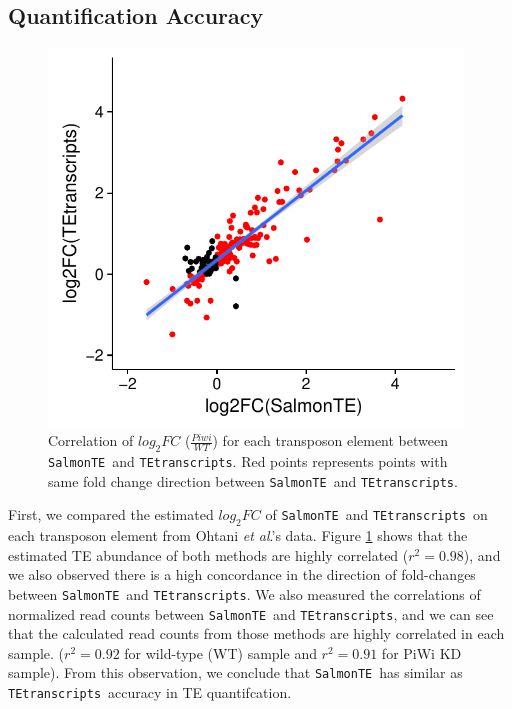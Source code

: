 \documentclass{ws-procs11x85}
\newcommand{\etal}{\textit{et al}.}
\newcommand{\TEtranscripts}{\texttt{TEtranscripts}}
\newcommand{\SalmonTE}{\texttt{SalmonTE}}
\begin{document}
\subsection{Quantification Accuracy}

\begin{figure}[h]
\centerline{
\includegraphics[width=11cm]{figure_corr_FC}
}
\caption{Correlation of $log_{2}FC$ ($\frac{Piwi}{WT}$) for each transposon element between \SalmonTE~and \TEtranscripts. Red points represents points with same fold change direction between \SalmonTE~and \TEtranscripts.}
\label{aba:fig2}
\end{figure}

First, we compared the estimated $log_{2}FC$ of \SalmonTE~and \TEtranscripts~on each transposon element from Ohtani \etal's data. 
Figure \ref{aba:fig2} shows that the estimated TE abundance of both methods are highly correlated ($r^{2}=0.98$), and we also observed there is a high concordance in the direction of fold-changes between \SalmonTE~and \TEtranscripts. We also measured the correlations of normalized read counts between \SalmonTE~and \TEtranscripts, 
and we can see that the calculated read counts from those methods are highly correlated in each sample. ($r^2=0.92$ for wild-type (WT) sample and $r^2=0.91$ for PiWi KD sample).
From this observation, we conclude that \SalmonTE~has similar as  \TEtranscripts~accuracy in TE quantifcation.
\end{document}
